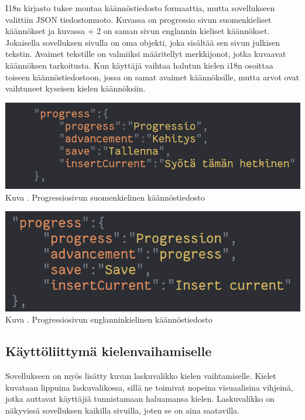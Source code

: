 \documentclass[11pt,a4paper,titlepage,oneside]{article}
\begin{document}

I18n kirjasto tukee montaa käännöstiedosto formaattia, mutta sovellukseen valittiin JSON tiedostomuoto.
Kuvassa \nextImageCount{} on progressio sivun suomenkieliset käännökset ja kuvassa {\the\numexpr \theimgCounter + 2 } on saman sivun englannin kieliset käännökset.
Jokaisella sovelluksen sivulla on oma objekti, joka sisältää sen sivun julkisen tekstin. 
Avaimet tekstille on valmiiksi määritellyt merkkijonot, jotka kuvaavat käännöksen tarkoitusta.
Kun käyttäjä vaihtaa halutun kielen i18n osoittaa toiseen käännöstiedostoon, 
jossa on samat avaimet käännöksille, mutta arvot ovat vaihtuneet kyseisen kielen käännöksiin.
\medskip


\bigskip
\includegraphics[width = 15cm]{src/public/oppar/translationfile.png}\\
Kuva \getImgCount. {} Progressiosivun suomenkielinen käännöstiedosto 
\medskip


\bigskip
\includegraphics[width = 15cm]{src/public/oppar/translationfileEng.png}\\
Kuva \getImgCount {}. Progressiosivun englanninkielinen käännöstiedosto
\medskip




\subsection{Käyttöliittymä kielenvaihamiselle}


Sovellukseen on myös lisätty kuvan \nextImageCount{} laskuvalikko kielen vaihtamiselle. 
Kielet kuvataan lippuina laskuvalikossa,
sillä ne toimivat nopeina visuaalisina vihjeinä, jotka auttavat käyttäjiä tunnistamaan haluamansa kielen.
Laskuvalikko on näkyvissä sovelluksen kaikilla sivuilla, joten se on aina saatavilla.
\medskip
\end{document}
